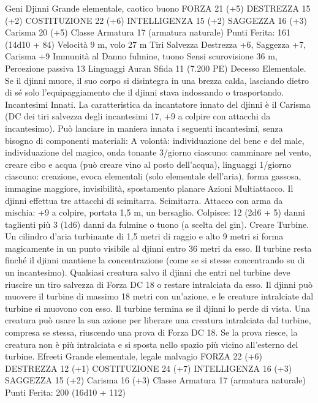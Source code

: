\begin{multicols}{2}
Geni
Djinni
Grande elementale, caotico buono
FORZA 21 (+5)
DESTREZZA 15 (+2)
COSTITUZIONE 22 (+6)
INTELLIGENZA 15 (+2)
SAGGEZZA 16 (+3)
Carisma 20 (+5)
Classe Armatura 17 (armatura naturale)
\hspace*{0pt}\hfill{Punti Ferita}: 161 (14d10 + 84)
Velocità 9 m, volo 27 m
Tiri Salvezza Destrezza +6, Saggezza +7, Carisma +9
Immunità al Danno fulmine, tuono
Sensi scurovisione 36 m, Percezione passiva 13
Linguaggi Auran
Sfida 11 (7.200 PE)
Decesso Elementale. Se il djinni muore, il suo corpo si
disintegra in una brezza calda, lasciando dietro di sé solo
l’equipaggiamento che il djinni stava indossando o trasportando.
Incantesimi Innati. La caratteristica da incantatore innato del
djinni è il Carisma (DC dei tiri salvezza degli incantesimi 17, +9
a colpire con attacchi da incantesimo). Può lanciare in maniera
innata i seguenti incantesimi, senza bisogno di componenti
materiali:
A volontà: individuazione del bene e del male, individuazione del
magico, onda tonante
3/giorno ciascuno: camminare nel vento, creare cibo e acqua
(può creare vino al posto dell’acqua), linguaggi
1/giorno ciascuno: creazione, evoca elementali (solo elementale
dell’aria), forma gassosa, immagine maggiore, invisibilità,
spostamento planare
Azioni
Multiattacco. Il djinni effettua tre attacchi di scimitarra.
Scimitarra. Attacco con arma da mischia: +9 a colpire, portata
1,5 m, un bersaglio.
Colpisce: 12 (2d6 + 5) danni taglienti più 3 (1d6) danni da
fulmine o tuono (a scelta del gin).
Creare Turbine. Un cilindro d’aria turbinante di 1,5 metri di
raggio e alto 9 metri si forma magicamente in un punto visibile al
djinni entro 36 metri da esso. Il turbine resta finché il djinni
mantiene la concentrazione (come se si stesse concentrando su di
un incantesimo). Qualsiasi creatura salvo il djinni che entri nel
turbine deve riuscire un tiro salvezza di Forza DC 18 o restare
intralciata da esso. Il djinni può muovere il turbine di massimo
18 metri con un’azione, e le creature intralciate dal turbine si
muovono con esso. Il turbine termina se il djinni lo perde di
vista.
Una creatura può usare la sua azione per liberare una creatura
intralciata dal turbine, compresa se stessa, riuscendo una prova di
Forza DC 18. Se la prova riesce, la creatura non è più intralciata
e si sposta nello spazio più vicino all’esterno del turbine.
Efreeti
Grande elementale, legale malvagio
FORZA 22 (+6)
DESTREZZA 12 (+1)
COSTITUZIONE 24 (+7)
INTELLIGENZA 16 (+3)
SAGGEZZA 15 (+2)
Carisma 16 (+3)
Classe Armatura 17 (armatura naturale)
\hspace*{0pt}\hfill{Punti Ferita}: 200 (16d10 + 112)

\end{multicols}

